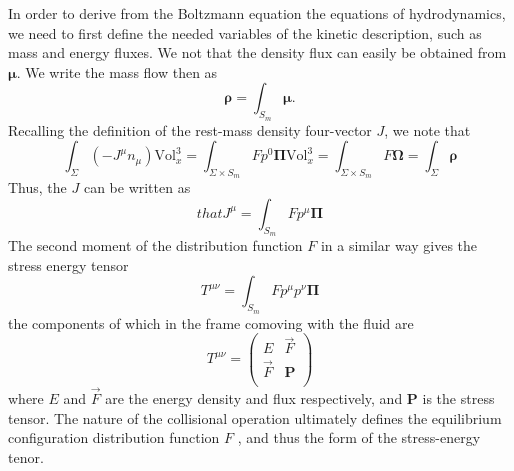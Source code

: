 In order to derive from the Boltzmann equation the equations of hydrodynamics, 
we need to first define the needed variables of the kinetic description, such as mass and energy fluxes. 
We not that the density flux can easily be obtained from $\boldsymbol{\mu}$. 
We write the mass flow then as 
%
\begin{equation}
\boldsymbol{\rho} = \int_{S_m} \boldsymbol{\mu}.
\end{equation}
%
Recalling the definition of the rest-mass density four-vector $J$, we note that
%
\begin{equation}
\int_{\Sigma}(-J^{\mu}n_{\mu})\text{Vol}_x ^3 = \int_{\Sigma\times S_{m}} Fp^0\boldsymbol{\Pi}\text{Vol}_x ^3 = \int_{\Sigma\times S_{m}} F\boldsymbol{\Omega} = \int_{\Sigma}\boldsymbol{\rho}
\end{equation}
%
Thus, the $J$ can be written as 
%
\begin{equation}that
J^{\mu} = \int_{S_m}Fp^{\mu}\boldsymbol{\Pi}
\end{equation}
%
The second moment of the distribution function $F$ in a 
similar way gives the stress energy tensor 
%
\begin{equation}
T^{\mu\nu} = \int_{S_m} F p^{\mu}p^{\nu}\boldsymbol{\Pi}
\end{equation}
%
the components of which in the frame comoving with the fluid are
%
\begin{equation}
T^{\mu\nu} = 
\begin{pmatrix}
E & \vec{F} \\
\vec{F} & \boldsymbol{P} \\
\end{pmatrix}
\end{equation}
%
where $E$ and $\vec{F}$ are the energy density and flux respectively, 
and $\boldsymbol{P}$ is the stress tensor. 
%
The nature of the collisional operation ultimately defines the equilibrium configuration 
distribution function $F$ , and thus the form of the stress-energy tenor. 


